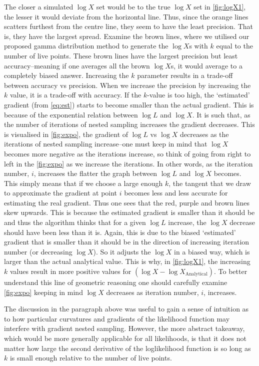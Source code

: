 The closer a simulated $\log X$ set would be to the true $\log X$ set in \cref{fig:logX1}, the lesser it would deviate from the horizontal line. Thus, since the orange lines scatters furthest from the centre line, they seem to have the least precision. That is, they have the largest spread. Examine the brown lines, where we utilised our proposed gamma distribution method to generate the $\log X$s with $k$ equal to the number of live points. These brown lines have the largest precision but least accuracy--meaning if one averages all the brown $\log X$s, it would average to a completely biased answer. Increasing the $k$ parameter results in a trade-off between accuracy vs precision. When we increase the precision by increasing the $k$ value, it is a trade-off with accuracy. If the $k$-value is too high, the `estimated' gradient (from \cref{eq:est}) starts to become smaller than the actual gradient. This is because of the exponential relation between $\log L$ and $\log X$. It is such that, as the number of iterations of nested sampling increases the gradient decreases. This is visualised in \cref{fig:expo}, the gradient of $\log L$ vs $\log X$ decreases as the iterations of nested sampling increase--one must keep in mind that $\log X$ becomes more negative as the iterations increase, so think of going from right to left in the \cref{fig:expo} as we increase the iterations. In other words, as the iteration number, $i$, increases the flatter the graph between $\log L$ and $\log X$ becomes. This simply means that if we choose a large enough $k$, the tangent that we draw to approximate the gradient at point $i$ becomes less and less accurate for estimating the real gradient. Thus one sees that the red, purple and brown lines skew upwards. This is because the estimated gradient is smaller than it should be and thus the algorithm thinks that for a given $\log L$ increase, the $\log X$ decrease should have been less than it is. Again, this is due to the biased `estimated' gradient that is smaller than it should be in the direction of increasing iteration number (or decreasing $\log X$). So it adjusts the $\log X$ in a biased way, which is larger than the actual analytical value. This is why, in \cref{fig:logX1}, the increasing $k$ values result in more positive values for $(\log X -\log X_{\mathrm{Analytical}})$. To better understand this line of geometric reasoning one should carefully examine \cref{fig:expo} keeping in mind $\log X$ decreases as iteration number, $i$, increases.



The discussion in the paragraph above was useful to gain a sense of intuition as to how particular curvatures and gradients of the likelihood function may interfere with gradient nested sampling. However, the more abstract takeaway, which would be more generally applicable for all likelihoods, is that it does not matter how large the second derivative of the loglikelihood function is so long as $k$ is small enough relative to the number of live points.


